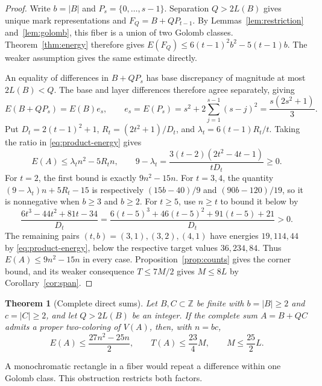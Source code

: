 \documentclass[11pt,a4paper]{article}
\newtheorem{theorem}{Theorem}[section]
\theoremstyle{definition}
\newcommand{\Z}{\mathbb Z}
\numberwithin{equation}{section}
\begin{document}
\begin{proof}
Write $b=|B|$ and $P_s=\{0,\ldots,s-1\}$. Separation $Q>2L(B)$ gives unique mark representations and $F_Q=B+QP_{t-1}$. By Lemmas~\ref{lem:restriction} and~\ref{lem:golomb}, this fiber is a union of two Golomb classes. Theorem~\ref{thm:energy} therefore gives $E(F_Q)\le6(t-1)^2b^2-5(t-1)b$. The weaker assumption gives the same estimate directly.

An equality of differences in $B+QP_s$ has base discrepancy of magnitude at most $2L(B)<Q$. The base and layer differences therefore agree separately, giving
\begin{equation}\label{eq:product-energy}
E(B+QP_s)=E(B)e_s,\qquad
e_s=E(P_s)=s^2+2\sum_{j=1}^{s-1}(s-j)^2=\frac{s(2s^2+1)}3.
\end{equation}
Put $D_t=2(t-1)^2+1$, $R_t=(2t^2+1)/D_t$, and $\lambda_t=6(t-1)R_t/t$. Taking the ratio in \eqref{eq:product-energy} gives
\begin{equation}\label{eq:progression-comparison}
E(A)\le\lambda_t n^2-5R_tn,\qquad
9-\lambda_t=\frac{3(t-2)(2t^2-4t-1)}{tD_t}\ge0.
\end{equation}
For $t=2$, the first bound is exactly $9n^2-15n$. For $t=3,4$, the quantity $(9-\lambda_t)n+5R_t-15$ is respectively $(15b-40)/9$ and $(90b-120)/19$, so it is nonnegative when $b\ge3$ and $b\ge2$. For $t\ge5$, use $n\ge t$ to bound it below by
\[
\frac{6t^3-44t^2+81t-34}{D_t}
=\frac{6(t-5)^3+46(t-5)^2+91(t-5)+21}{D_t}>0.
\]
The remaining pairs $(t,b)=(3,1),(3,2),(4,1)$ have energies $19,114,44$ by \eqref{eq:product-energy}, below the respective target values $36,234,84$. Thus $E(A)\le9n^2-15n$ in every case. Proposition~\ref{prop:counts} gives the corner bound, and its weaker consequence $T\le7M/2$ gives $M\le8L$ by Corollary~\ref{cor:span}.
\end{proof}

\begin{theorem}[Complete direct sums]\label{thm:direct}
Let $B,C\subset\Z$ be finite with $b=|B|\ge2$ and $c=|C|\ge2$, and let $Q>2L(B)$ be an integer. If the complete sum $A=B+QC$ admits a proper two-coloring of $V(A)$, then, with $n=bc$,
\begin{equation}\label{eq:direct-bounds}
E(A)\le\frac{27n^2-25n}{2},\qquad T(A)\le\frac{23}{4}M,\qquad M\le\frac{25}{2}L.
\end{equation}
\end{theorem}
A monochromatic rectangle in a fiber would repeat a difference within one Golomb class. This obstruction restricts both factors.
\end{document}
